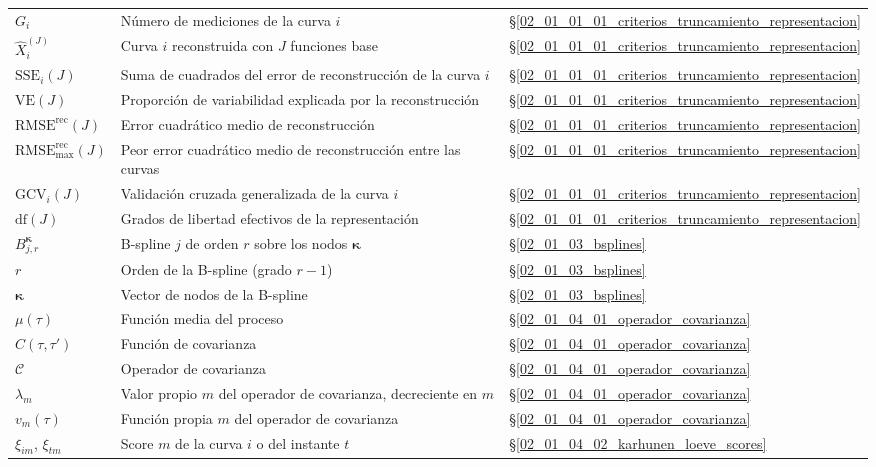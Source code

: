 \begin{longtable}{p{} p{} p{}}
$G_i$ & Número de mediciones de la curva $i$ & \S\ref{02_01_01_01_criterios_truncamiento_representacion} \\
$\widehat{X}_i^{(J)}$ & Curva $i$ reconstruida con $J$ funciones base & \S\ref{02_01_01_01_criterios_truncamiento_representacion} \\
$\mathrm{SSE}_i(J)$ & Suma de cuadrados del error de reconstrucción de la curva $i$ & \S\ref{02_01_01_01_criterios_truncamiento_representacion} \\
$\mathrm{VE}(J)$ & Proporción de variabilidad explicada por la reconstrucción & \S\ref{02_01_01_01_criterios_truncamiento_representacion} \\
$\mathrm{RMSE}^{\mathrm{rec}}(J)$ & Error cuadrático medio de reconstrucción & \S\ref{02_01_01_01_criterios_truncamiento_representacion} \\
$\mathrm{RMSE}^{\mathrm{rec}}_{\max}(J)$ & Peor error cuadrático medio de reconstrucción entre las curvas & \S\ref{02_01_01_01_criterios_truncamiento_representacion} \\
$\mathrm{GCV}_i(J)$ & Validación cruzada generalizada de la curva $i$ & \S\ref{02_01_01_01_criterios_truncamiento_representacion} \\
$\mathrm{df}(J)$ & Grados de libertad efectivos de la representación & \S\ref{02_01_01_01_criterios_truncamiento_representacion} \\
$B_{j,r}^{\boldsymbol{\kappa}}$ & B-spline $j$ de orden $r$ sobre los nodos $\boldsymbol{\kappa}$ & \S\ref{02_01_03_bsplines} \\
$r$ & Orden de la B-spline (grado $r-1$) & \S\ref{02_01_03_bsplines} \\
$\boldsymbol{\kappa}$ & Vector de nodos de la B-spline & \S\ref{02_01_03_bsplines} \\
$\mu(\tau)$ & Función media del proceso & \S\ref{02_01_04_01_operador_covarianza} \\
$C(\tau, \tau')$ & Función de covarianza & \S\ref{02_01_04_01_operador_covarianza} \\
$\mathcal{C}$ & Operador de covarianza & \S\ref{02_01_04_01_operador_covarianza} \\
$\lambda_m$ & Valor propio $m$ del operador de covarianza, decreciente en $m$ & \S\ref{02_01_04_01_operador_covarianza} \\
$v_m(\tau)$ & Función propia $m$ del operador de covarianza & \S\ref{02_01_04_01_operador_covarianza} \\
$\xi_{im}$, $\xi_{tm}$ & Score $m$ de la curva $i$ o del instante $t$ & \S\ref{02_01_04_02_karhunen_loeve_scores} \\

\end{longtable}
